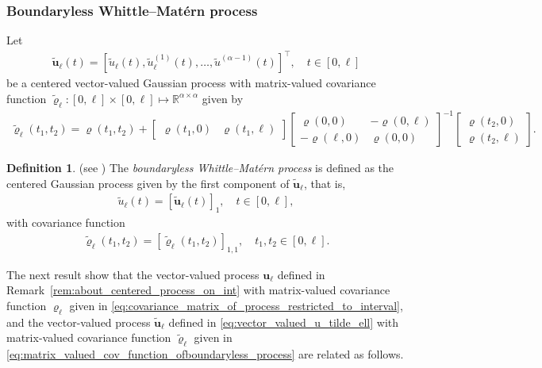 \documentclass[11pt,a4paper]{article}
\theoremstyle{plain}
\theoremstyle{definition}
\newtheorem{definition}[theorem]{Definition}
\begin{document}
\subsubsection{Boundaryless Whittle--Matérn process}
Let 
    \begin{align}
    \label{eq:vector_valued_u_tilde_ell}
        \widetilde{\boldsymbol{u}}_\ell(t) =  [\widetilde{u}_\ell(t),\widetilde{u}_\ell^{(1)}(t),\dots, \widetilde{u}^{(\alpha-1)}(t)]^\top,\quad t\in[0,\ell]
    \end{align}
    be a centered vector-valued Gaussian process with matrix-valued covariance function $\widetilde{\boldsymbol{\varrho}}_{\ell} : [0,\ell] \times [0,\ell] \mapsto \mathbb{R}^{\alpha \times \alpha}$ given by
    \begin{align}
    \label{eq:matrix_valued_cov_function_ofboundaryless_process}
	\widetilde{\boldsymbol{\varrho}}_{\ell}\left(t_1,t_2\right) = \boldsymbol{\varrho}(t_1,t_2) +
	\begin{bmatrix}\boldsymbol{\varrho}(t_1, 0) & \boldsymbol{\varrho}(t_1,\ell)\end{bmatrix} 
	\begin{bmatrix}
		\boldsymbol{\varrho}(0,0)  & 	-\boldsymbol{\varrho}(0,\ell) \\
		-\boldsymbol{\varrho}(\ell,0)  & 	\boldsymbol{\varrho}(0,0)
	\end{bmatrix}^{-1} 
	\begin{bmatrix}\boldsymbol{\varrho}(t_2,0)\\
		\boldsymbol{\varrho}(t_2,\ell)
	\end{bmatrix}.
\end{align}
\begin{definition}
\label{def:def_bondaryless_whittle_matern_process}
\textnormal{(see \cite[Definition~2]{Bolin2023Statistical})}
The \emph{boundaryless Whittle--Matérn process} is defined as the centered Gaussian process given by the first component of $\widetilde{\boldsymbol{u}}_\ell$, that is,
\begin{align*}
    \widetilde{u}_\ell(t) = [\widetilde{\boldsymbol{u}}_\ell(t)]_1, 
    \quad t \in [0,\ell],
\end{align*}
with covariance function
\begin{align}
\label{eq:univariate_covariance_function_of_boundaryless_process}
    \widetilde{\varrho}_{\ell}(t_1,t_2) 
    = [\widetilde{\boldsymbol{\varrho}}_{\ell}(t_1,t_2)]_{1,1}, 
    \quad t_1,t_2 \in [0,\ell].
\end{align}
\end{definition}
The next result show that the vector-valued process $\boldsymbol{u}_\ell$ defined in Remark~\ref{rem:about_centered_process_on_int} with matrix-valued covariance function $\boldsymbol{\varrho}_\ell$ given in \eqref{eq:covariance_matrix_of_process_restricted_to_interval}, and the vector-valued process $\widetilde{\boldsymbol{u}}_\ell$ defined in \eqref{eq:vector_valued_u_tilde_ell} with matrix-valued covariance function $\widetilde{\boldsymbol{\varrho}}_{\ell}$ given in \eqref{eq:matrix_valued_cov_function_ofboundaryless_process} are related as follows.
\end{document}
